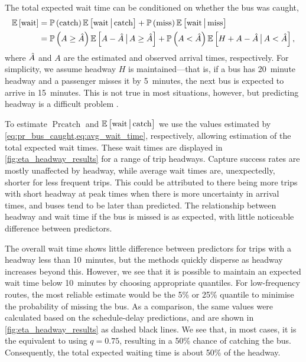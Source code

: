 The total expected wait time can be conditioned on whether the bus was caught,
\begin{equation}
\label{eq:eta_wait_conditional}
\begin{split}
\mathbb{E}\left[\text{wait}\right] &=
  \mathbb{P}\left(\text{catch}\right) \mathbb{E}\left[\text{wait}\,\big|\,{}\text{catch}\right] +
  \mathbb{P}\left(\text{miss}\right) \mathbb{E}\left[\text{wait}\,\big|\,{}\text{miss}\right] \\
  &= \mathbb{P}\left(A \geq \hat{A}\right) \mathbb{E}\left[A - \hat{A} \,\big|\,{} A \geq \hat{A}\right] +
  \mathbb{P}\left(A < \hat{A}\right)\mathbb{E}\left[H + A - \hat{A} \,\big|\,{} A < \hat{A}\right],
\end{split}
\end{equation}
where $\hat{A}$ and $A$ are the estimated and observed arrival times, respectively. For simplicity, we assume headway $H$ is maintained---that is, if a bus has 20~minute headway and a passenger misses it by 5~minutes, the next bus is expected to arrive in 15~minutes. This is not true in most situations, however, but predicting headway is a difficult problem \citep{Chen_2012,Hans_2014,Hans_2015}.


To estimate $\Pr{\text{catch}}$ and $\mathbb{E}\left[\text{wait}\,\big|\,{}\text{catch}\right]$ we use the values estimated by \cref{eq:pr_bus_caught,eq:avg_wait_time}, respectively, allowing estimation of the total expected wait times. These wait times are displayed in \cref{fig:eta_headway_results} for a range of trip headways. Capture success rates are mostly unaffected by headway, while average wait times are, unexpectedly, shorter for less frequent trips. This could be attributed to there being more trips with short headway at peak times when there is more uncertainty in arrival times, and buses tend to be later than predicted. The relationship between headway and wait time if the bus is missed is as expected, with little noticeable difference between predictors.


The overall wait time shows little difference between predictors for trips with a headway less than 10~minutes, but the methods quickly disperse as headway increases beyond this. However, we see that it is possible to maintain an expected wait time below 10~minutes by choosing appropriate quantiles. For low-frequency routes, the most reliable estimate would be the 5\% or 25\% quantile to minimise the probability of missing the bus. As a comparison, the same values were calculated based on the schedule-delay predictions, and are shown in \cref{fig:eta_headway_results} as dashed black lines. We see that, in most cases, it is the equivalent to using $q=0.75$, resulting in a 50\% chance of catching the bus. Consequently, the total expected waiting time is about 50\% of the headway.


